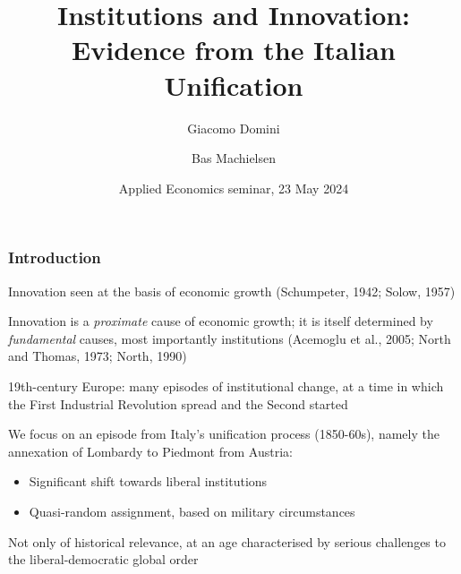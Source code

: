 \documentclass[10pt]{beamer}
\title[Institutions and innovation]{Institutions and Innovation: \\ Evidence from the Italian Unification}
\author[Domini \& Machielsen]{Giacomo Domini\inst{} 
    \and Bas Machielsen\inst{}}
\institute{
    \inst{} Utrecht University School of Economics}
\date[May 2024]{Applied Economics seminar, 23 May 2024}
\begin{document}
\begin{frame}
  \titlepage
\end{frame}

\begin{frame}
    \frametitle{Introduction}
    
    Innovation seen at the basis of economic growth (Schumpeter, 1942; Solow, 1957) \\  \bigskip
    
    Innovation is a \textit{proximate} cause of economic growth; it is itself determined by \textit{fundamental} causes, most importantly institutions (Acemoglu  et al., 2005; North and Thomas, 1973; North, 1990) \\    \bigskip
    
    \pause
    
    19th-century Europe: many episodes of institutional change, at a time in which the First Industrial Revolution spread and the Second  started \\    \bigskip

    We focus on an episode from Italy's unification process (1850-60s), namely the annexation of Lombardy to Piedmont from Austria:
    
    \begin{itemize}
        \item Significant shift towards liberal institutions
        \item Quasi-random assignment, based on military circumstances
    \end{itemize}

    \bigskip
    
    Not only of historical relevance, at an age characterised by serious challenges to the liberal-democratic global order 
    
\end{frame}
\end{document}
